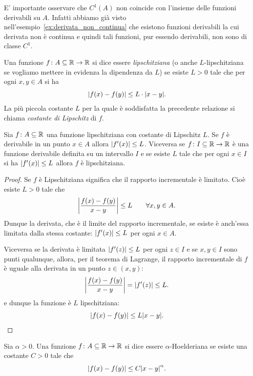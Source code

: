 E' importante osservare che $C^1(A)$ non coincide con l'insieme delle funzioni derivabili su $A$. Infatti abbiamo già visto nell'esempio~\ref{ex:derivata_non_continua} che esistono funzioni derivabili la cui derivata non è continua e quindi tali funzioni, pur essendo derivabili, non sono di classe $C^1$.

\begin{definition}
\mymark{**}
Una funzione $f\colon A\subseteq {\mathbb R} \to {\mathbb R}$ si dice essere 
\emph{lipschitziana} (o anche $L$-lipschitziana se vogliamo mettere 
in evidenza la dipendenza da $L$) se esiste $L>0$ tale che
per ogni $x,y\in A$ si ha 
\[
  {\left|f(x) - f(y)\right|} \le L\cdot  {\left|x-y\right|}.
\]
La più piccola costante $L$ per la quale è soddisfatta la precedente relazione si chiama \emph{costante di Lipschitz}
di $f$.
\end{definition}

\begin{theorem}
\mymark{**}
Sia $f\colon A \subseteq {\mathbb R}$ una funzione lipschitziana
con costante di Lipschitz $L$.
Se $f$ è derivabile in un punto $x\in A$ allora ${\left|f'(x)\right|}\le L$.
Viceversa se $f\colon I \subseteq {\mathbb R} \to {\mathbb R}$ è una funzione derivabile 
definita su un intervallo $I$
e se esiste $L$ tale che per ogni $x\in I$ si ha ${\left|f'(x)\right|}\le L$ 
allora $f$ è lipschitziana.
\end{theorem}
%
\begin{proof}
Se $f$ è Lipschitziana significa che il rapporto incrementale è limitato.
Cioè esiste $L>0$ tale che
\[
  {\left|\frac{f(x) - f(y)}{x-y}\right|} \le L \qquad \forall x,y\in A.
\]
Dunque la derivata, che è il limite del rapporto incrementale, se esiste è anch'essa limitata
dalla stessa costante: ${\left|f'(x)\right|}\le L$ per ogni $x \in A$.

Viceversa se la derivata è limitata ${\left|f'(z)\right|}\le L$ per ogni $z \in I$ e se $x,y\in I$ sono punti qualunque,
allora, per il teorema di Lagrange, il rapporto incrementale di $f$ è uguale alla derivata in un punto $z\in(x,y)$:
\[
  {\left|\frac{f(x) - f(y)}{x-y}\right|} = {\left|f'(z)\right|} \le L.
\]
e dunque la funzione è $L$ lipschitziana:
\[
  {\left|f(x)- f(y)\right|} \le L {\left|x-y\right|}.
\]
\end{proof}

\begin{definition}
Sia $\alpha>0$.
Una funzione $f\colon A \subseteq {\mathbb R} \to {\mathbb R}$ si dice essere $\alpha$-Hoelderiana se
esiste una costante $C>0$ tale che
\begin{equation}\label{eq:2964536}
  {\left|f(x) - f(y)\right|} \le C {\left|x-y\right|}^\alpha.
\end{equation}
\end{definition}

